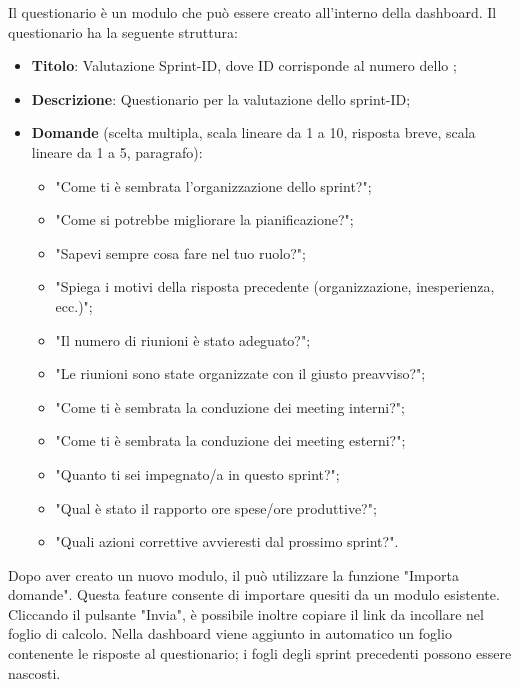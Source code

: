 \par Il questionario è un modulo  che può essere creato all'interno della dashboard. Il questionario ha la seguente struttura:
\begin{itemize}
  \item \textbf{Titolo}: Valutazione Sprint-ID, dove ID corrisponde al numero dello ;
  \item \textbf{Descrizione}: Questionario per la valutazione dello sprint-ID;
  \item \textbf{Domande} (scelta multipla, scala lineare da 1 a 10, risposta breve, scala lineare da 1 a 5, paragrafo):
  \begin{itemize}
    \item "Come ti è sembrata l'organizzazione dello sprint?";
    \item "Come si potrebbe migliorare la pianificazione?";
    \item "Sapevi sempre cosa fare nel tuo ruolo?";
    \item "Spiega i motivi della risposta precedente (organizzazione, inesperienza, ecc.)";
    \item "Il numero di riunioni è stato adeguato?";
    \item "Le riunioni sono state organizzate con il giusto preavviso?";
    \item "Come ti è sembrata la conduzione dei meeting interni?";
    \item "Come ti è sembrata la conduzione dei meeting esterni?";
    \item "Quanto ti sei impegnato/a in questo sprint?";
    \item "Qual è stato il rapporto ore spese/ore produttive?";
    \item "Quali azioni correttive avvieresti dal prossimo sprint?".
  \end{itemize}
\end{itemize}
\par Dopo aver creato un nuovo modulo, il \Responsabile{} può utilizzare la funzione "Importa domande". Questa feature consente di importare quesiti da un modulo esistente. Cliccando il pulsante "Invia", è possibile inoltre copiare il link da incollare nel foglio di calcolo. Nella dashboard  viene aggiunto in automatico un foglio contenente le risposte al questionario; i fogli degli sprint precedenti possono essere nascosti.


